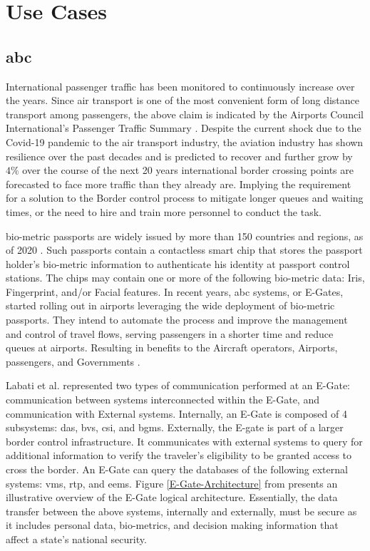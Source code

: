 \chapter{Use Cases}
\label{ch:usecases}

\section{\gls{abc}}
International passenger traffic has been monitored to continuously increase over the years. Since air transport is one of the most convenient form of long distance transport among passengers, the above claim is indicated by the Airports Council International's Passenger Traffic Summary . Despite the current shock due to the Covid-19 pandemic to the air transport industry, the aviation industry has shown resilience over the past decades and is predicted to recover and further grow by $ 4\% $ over the course of the next 20 years  international border crossing points are forecasted to face more traffic than they already are. Implying the requirement for a solution to the Border control process to mitigate longer queues and waiting times, or the need to hire and train more personnel to conduct the task.
\par
bio-metric passports are widely issued by more than 150 countries and regions, as of 2020 . Such passports contain a contactless smart chip that stores the passport holder's bio-metric information to authenticate his identity at passport control stations. The chips may contain one or more of the following bio-metric data: Iris, Fingerprint, and/or Facial features. In recent years, \gls{abc} systems, or E-Gates, started rolling out in airports leveraging the wide deployment of bio-metric passports. They intend to automate the process and improve the management and control of travel flows, serving passengers in a shorter time and reduce queues at airports. Resulting in benefits to the Aircraft operators, Airports, passengers, and Governments \cite{Angiolelli-meyer2015}.
\par
Labati et al. \cite{labati2016biometric} represented two types of communication performed at an E-Gate: communication between systems interconnected within the E-Gate, and communication with External systems. Internally, an E-Gate is composed of 4 subsystems: \gls{das}, \gls{bvs}, \gls{csi}, and \gls{bgms}. Externally, the E-gate is part of a larger border control infrastructure. It communicates with external systems to query for additional information to verify the traveler's eligibility to be granted access to cross the border. An E-Gate can query the databases of the following external systems: \gls{vms}, \gls{rtp}, and \gls{eems}. Figure \ref{E-Gate-Architecture} from \cite{labati2016biometric} presents an illustrative overview of the E-Gate logical architecture. Essentially, the data transfer between the above systems, internally and externally, must be secure as it includes personal data, bio-metrics, and decision making information that affect a state's national security.
